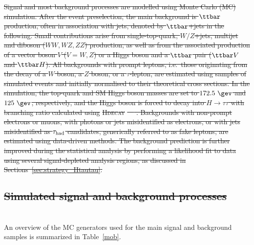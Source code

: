\documentclass[PAPER, coverpage, atlasdraft=true, texlive=2016, UKenglish]{\ATLASLATEXPATH atlasdoc}
\providecommand{\DIFadd}[1]{{\protect\color{blue}\uwave{#1}}} %
\providecommand{\DIFdel}[1]{{\protect\color{red}\sout{#1}}}                      %
\providecommand{\DIFaddbegin}{} %
\providecommand{\DIFaddend}{} %
\providecommand{\DIFdelend}{} %
\begin{document}
\DIFdel{Signal and most background processes are modelled using Monte Carlo (MC) simulation.
After the event preselection, the main background is $\ttbar$ production, often in association with jets, denoted by $\ttbar$+jets in the following.
Small contributions arise from single-top-quark, $W/Z$+jets, multijet and diboson ($WW,WZ,ZZ$) production, as well as from the associated 
production of a vector boson $V$ ($V=W,Z$) or a Higgs boson and a $\ttbar$ pair ($\ttbar V$ and $\ttbar H$). All backgrounds 
with prompt leptons, i.e.\ those originating from the decay of a $W$ boson, a $Z$ boson, or a $\tau$-lepton,
are estimated using samples of simulated events and initially normalised to their theoretical cross sections.
In the simulation, the top-quark and SM Higgs boson masses are set to $172.5~\gev$ and $125~\gev$, respectively,
and the Higgs boson is forced to decay into $H\to \tau\tau$ with branching ratio calculated using }\textsc{\DIFdel{Hdecay}}%
\DIFdel{~\mbox{%
\cite{Djouadi:1997yw}}\hspace{0pt}%
.  
Backgrounds with non-prompt electrons or muons, with photons or jets misidentified as electrons, or with jets misidentified as $\tau_{\mathrm{had}}$ candidates, 
generically referred to as fake leptons, are estimated using data-driven methods. 
The background prediction is further improved during the statistical analysis by performing a likelihood 
fit to data using several signal-depleted analysis regions, as discussed in Sections~\ref{sec:strategy_Htautau}.
}%

\subsection{\DIFdel{Simulated signal and background processes}}
\addtocounter{subsection}{-1}%
\DIFdelend \DIFaddbegin \section{\DIFadd{Simulated samples}}
\DIFaddend \label{sec:simulations}

An overview of the MC generators used for the main signal and background samples is summarized in Table~\ref{mob}.
\end{document}
